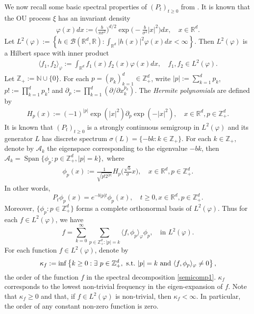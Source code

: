 \documentclass[12pt,a4paper]{amsart}
\theoremstyle{plain}
\theoremstyle{definition}
\numberwithin{equation}{section}
\begin{document}
We now recall some basic spectral properties of $(P_t)_{t\geq 0}$ from \cite{MetafunePallaraPriola2002Spectrum}.
It is known that the OU process $\xi$ has an invariant density
\begin{align}
\label{invariantdensity}
  \varphi(x)dx
  :=\Big (\frac{b}{\pi \sigma^2}\Big )^{d/2}\exp \Big(-\frac{b}{\sigma^2}|x|^2 \Big)dx,
  \quad x\in \mathbb R^d.
\end{align}
Let $L^2(\varphi):= \left\{ h  \in \mathcal B(\mathbb R^d, \mathbb R): \int_{\mathbb R^d} |h(x)|^2 \varphi(x) dx < \infty \right\}$.
Then $L^2(\varphi)$ is a Hilbert space with inner product
\begin{align}
  \langle f_1, f_2 \rangle_{\varphi}
  := \int_{\mathbb R^d}f_1(x)f_2(x)\varphi(x) dx, \quad f_1,f_2 \in L^2(\varphi).
\end{align}
Let $\mathbb Z_+ := \mathbb N\cup\{0\}$.
For each $p = (p_k)_{k = 1}^d \in \mathbb{Z}_+^{d}$, write $|p|:=\sum_{k=1}^d p_k$, $p!:= \prod_{k= 1}^d p_k!$ and $\partial_p:= \prod_{k = 1}^d(\partial/\partial x_k^{p_k})$.
The \emph{Hermite polynomials} are defined by
\begin{align}
  H_p(x)
  :=(-1)^{|p|}\exp(|x|^2) \partial_p \exp(-|x|^2)
  , \quad x\in \mathbb R^d, p \in \mathbb{Z}_+^{d}.
\end{align}
It is known that $(P_t)_{t\geq 0}$ is a strongly continuous semigroup in $L^2(\varphi)$ and its generator $L$ has discrete spectrum $\sigma(L)= \{-bk: k \in \mathbb Z_+\}$.
For each $k \in \mathbb Z_+$, denote by $\mathcal{A}_k$ the eigenspace corresponding to the eigenvalue $-bk$, then
$
\mathcal{A}_k
= \operatorname{Span} \{\phi_p : p\in \mathbb Z_+^d, |p|=k\},
$
where
\begin{align}
  \label{eigenfunction}
  \phi_p(x)
  := \frac{1}{\sqrt{ p! 2^{|p|} }} H_p \Big(\frac{ \sqrt{b} }{\sigma}x \Big)
  , \quad x\in \mathbb R^d, p\in \mathbb Z_+^d.
\end{align}
In other words,
\begin{equation}
  P_t\phi_p(x)
  =e^{-b|p|t}\phi_p(x),
  \quad t\geq 0, x\in \mathbb R^d, p\in \mathbb Z_+^d.
\end{equation}
Moreover, $\{\phi_p: p \in \mathbb Z_+^d\}$ forms a complete orthonormal basis of $L^2(\varphi)$.
Thus for each $f\in L^2(\varphi)$, we have
\begin{equation}
\label{semicomp1}
f
=\sum_{k=0}^{\infty}\sum_{p\in \mathbb Z_+^d:|p|=k}\langle f, \phi_p \rangle_{\varphi} \phi_p
, \quad \text{in~} L^2(\varphi).
\end{equation}
For each function $f\in L^2(\varphi)$, denote by
\begin{equation}
  \kappa_f
  :=\inf \left \{k\geq 0: \exists ~ p\in \mathbb Z_+^d ,{\rm ~s.t.~}|p|=k {\rm ~and~}  \langle f, \phi_p \rangle_{\varphi}\neq 0\right \},
\end{equation}
the order of the function $f$ in the spectral decomposition \eqref{semicomp1}.
$\kappa_f$ corresponds to the lowest non-trivial frequency in the eigen-expansion of $f$.
Note that $ \kappa_f\geq 0$ and that, if $f\in L^2(\varphi)$ is non-trivial, then $\kappa_f<\infty$.
In particular, the order of any constant non-zero function is zero.
\end{document}
